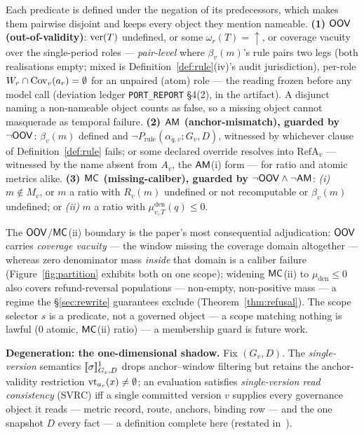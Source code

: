 \begin{definition}
\label{def:oov}\label{def:am}\label{def:mc}
 Each predicate is defined under the negation of its predecessors, which makes
them pairwise disjoint and keeps every object they mention nameable.
\textbf{(1) $\mathsf{OOV}$ (out-of-validity)}: $\mathrm{ver}(T)$ undefined, or some
$\omega_r(T)=\uparrow$, or coverage vacuity over the single-period roles
--- \emph{pair-level} where $\beta_v(m)$'s rule pairs two legs (both
realisations empty; mixed is Definition~\ref{def:rule}(iv)'s audit
jurisdiction), per-role $W_r\cap\mathrm{Cov}_v(a_r)=\emptyset$ for an unpaired
(atom) role --- the reading frozen before any model call (deviation ledger
\texttt{PORT\_REPORT} \S4(2), in the artifact). A disjunct naming a non-nameable object
counts as false, so a missing object cannot masquerade as temporal failure.
\textbf{(2) $\mathsf{AM}$ (anchor-mismatch), guarded by $\neg\mathsf{OOV}$}: $\beta_v(m)$
defined and $\neg P_{\mathrm{rule}}(\alpha_{q,v};G_v,D)$, witnessed by
whichever clause of Definition~\ref{def:rule} fails; or some declared
override resolves into $\mathrm{RefA}_v$ --- witnessed by the name absent
from $A_v$, the $\mathsf{AM}$(i) form --- for ratio and atomic metrics alike.
\textbf{(3) $\mathsf{MC}$ (missing-caliber), guarded by $\neg\mathsf{OOV}\wedge\neg\mathsf{AM}$}:
\emph{(i)} $m\notin M_v$, or $m$ a ratio with $R_v(m)$ undefined or not
recomputable or $\beta_v(m)$ undefined; or \emph{(ii)} $m$ a ratio with
$\mu^{\mathrm{den}}_{v,T}(q)\le0$.
\end{definition}

 The $\mathsf{OOV}$/$\mathsf{MC}$(ii) boundary is the paper's most consequential
adjudication: $\mathsf{OOV}$ carries \emph{coverage vacuity} --- the window missing
the coverage domain altogether --- whereas zero denominator mass
\emph{inside} that domain is a caliber failure (Figure~\ref{fig:partition}
exhibits both on one scope); widening $\mathsf{MC}$(ii) to $\mu_{\mathrm{den}}\le0$
also covers refund-reversal populations --- non-empty, non-positive mass ---
a regime the \S\ref{sec:rewrite} guarantees exclude
(Theorem~\ref{thm:refusal}). The scope selector
$s$ is a predicate, not a governed object --- a scope matching nothing is
lawful ($0$ atomic, $\mathsf{MC}$(ii) ratio) --- a membership guard is future work.

\smallskip\noindent{}\textbf{Degeneration: the one-dimensional shadow.}%
\label{sec:sem:degen}
Fix $(G_v,D)$. The \emph{single-version} semantics $[\![\sigma]\!]^1_{G_v,D}$
drops anchor--window filtering but retains the anchor-validity restriction
$\mathrm{vt}_{a_r}(x)\neq\emptyset$; an evaluation satisfies
\emph{single-version read consistency} (SVRC) iff a single committed
version $v$ supplies every governance object it reads --- metric record,
route, anchors, binding row --- and the one snapshot $D$ every fact ---
a definition complete here (restated in~\cite{asofgov-tr}).

